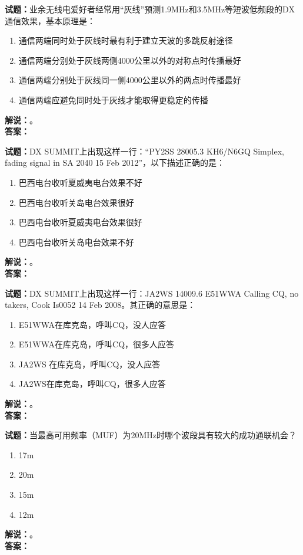\documentclass{ctexbook}
\begin{document}
\bigskip

\noindent\textbf{试题：}业余无线电爱好者经常用“灰线”预测1.9\unit{\MHz}和3.5\unit{\MHz}等短波低频段的DX通信效果，基本原理是：
\begin{enumerate}[leftmargin=3em]
  \item 通信两端同时处于灰线时最有利于建立天波的多跳反射途径
  \item 通信两端分别处于灰线两侧4000公里以外的对称点时传播最好
  \item 通信两端分别处于灰线同一侧4000公里以外的两点时传播最好
  \item 通信两端应避免同时处于灰线才能取得更稳定的传播
\end{enumerate}
\noindent\textbf{解说：}\textbf{}。\\\noindent\textbf{答案：}

\bigskip

\noindent\textbf{试题：}DX SUMMIT上出现这样一行：“PY2SS 28005.3 KH6/N6GQ Simplex, fading signal in SA 2040 15 Feb 2012”，以下描述正确的是：
\begin{enumerate}[leftmargin=3em]
  \item 巴西电台收听夏威夷电台效果不好
  \item 巴西电台收听关岛电台效果很好
  \item 巴西电台收听夏威夷电台效果很好
  \item 巴西电台收听关岛电台效果不好
\end{enumerate}
\noindent\textbf{解说：}\textbf{}。\\\noindent\textbf{答案：}

\bigskip

\noindent\textbf{试题：}DX SUMMIT上出现这样一行：JA2WS 14009.6 E51WWA Calling CQ, no takers, Cook Is0052 14 Feb 2008。其正确的意思是：
\begin{enumerate}[leftmargin=3em]
  \item E51WWA在库克岛，呼叫CQ，没人应答
  \item E51WWA在库克岛，呼叫CQ，很多人应答
  \item JA2WS 在库克岛，呼叫CQ，没人应答
  \item JA2WS在库克岛，呼叫CQ，很多人应答
\end{enumerate}
\noindent\textbf{解说：}\textbf{}。\\\noindent\textbf{答案：}

\bigskip

\noindent\textbf{试题：}当最高可用频率（MUF）为20\unit{\MHz}时哪个波段具有较大的成功通联机会？
\begin{enumerate}[leftmargin=3em]
  \item 17m
  \item 20m
  \item 15m
  \item 12m
\end{enumerate}
\noindent\textbf{解说：}\textbf{}。\\\noindent\textbf{答案：}
\end{document}
